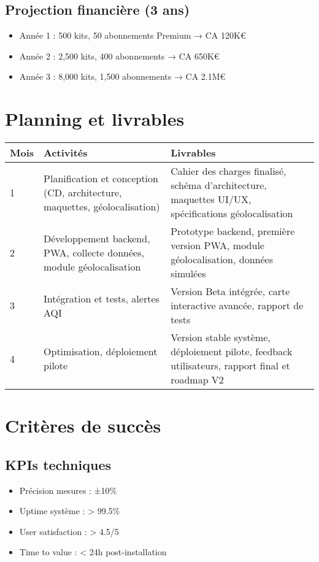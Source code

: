 \documentclass[12pt,a4paper]{article}
\begin{document}
\subsection{Projection financière (3 ans)}
\begin{itemize}
    \item Année 1 : 500 kits, 50 abonnements Premium → CA 120K€
    \item Année 2 : 2,500 kits, 400 abonnements → CA 650K€
    \item Année 3 : 8,000 kits, 1,500 abonnements → CA 2.1M€
\end{itemize}

\section{Planning et livrables}
\begin{longtable}{|>{\raggedright}p{3cm}|>{\raggedright}p{6cm}|>{\raggedright}p{6cm}|}
\hline
\textbf{Mois} & \textbf{Activités} & \textbf{Livrables} \\
\hline
1 & Planification et conception (CD, architecture, maquettes, géolocalisation) & Cahier des charges finalisé, schéma d'architecture, maquettes UI/UX, spécifications géolocalisation \\
2 & Développement backend, PWA, collecte données, module géolocalisation & Prototype backend, première version PWA, module géolocalisation, données simulées \\
3 & Intégration et tests, alertes AQI & Version Beta intégrée, carte interactive avancée, rapport de tests \\
4 & Optimisation, déploiement pilote & Version stable système, déploiement pilote, feedback utilisateurs, rapport final et roadmap V2 \\
\hline
\end{longtable}

\section{Critères de succès}
\subsection{KPIs techniques}
\begin{itemize}
    \item Précision mesures : ±10\%
    \item Uptime système : > 99.5\%
    \item User satisfaction : > 4.5/5
    \item Time to value : < 24h post-installation
\end{itemize}
\end{document}
